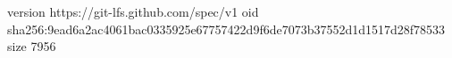 version https://git-lfs.github.com/spec/v1
oid sha256:9ead6a2ac4061bac0335925e67757422d9f6de7073b37552d1d1517d28f78533
size 7956
